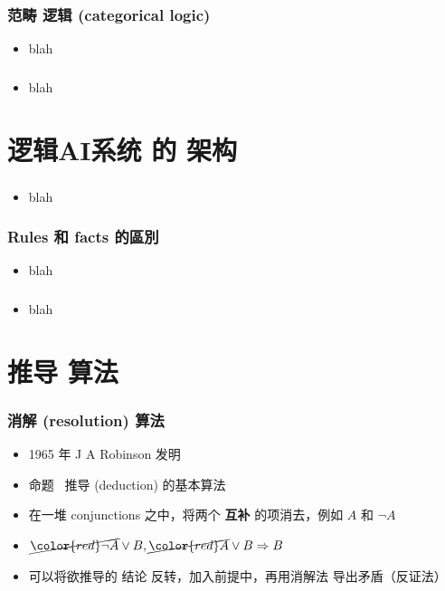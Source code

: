 \documentclass[17pt]{beamer}
\begin{document}
\begin{frame}
\frametitle{范畴 逻辑 (categorical logic)}
\begin{itemize}
	\item blah
\end{itemize}
\end{frame}

\begin{frame}
\frametitle{}
\begin{itemize}
	\item blah
\end{itemize}
\end{frame}

\section[Section]{逻辑AI系统 的 架构}
\frame{\sectionpage}

\begin{frame}
\frametitle{}
\begin{itemize}
	\item blah
\end{itemize}
\end{frame}


\begin{frame}
\frametitle{Rules 和 facts 的區別}
\begin{itemize}
	\item blah
\end{itemize}
\end{frame}



\begin{frame}
\frametitle{}
\begin{itemize}
	\item blah
\end{itemize}
\end{frame}

\section[Section]{推导 算法}
\frame{\sectionpage}

\begin{frame}
\frametitle{消解 (resolution) 算法}
\begin{itemize}
	\item 1965 年 J A Robinson 发明
	\item 命题 {\color{red}\ 推导} (deduction) 的基本算法
	\item 在一堆 conjunctions 之中，将两个 \textbf{互补} 的项消去，例如 $A$ 和 $\neg A$
	\item $\cancel{\color{red}\neg A} \vee B, \cancel{\color{red}A} \vee B \Rightarrow B$
	\item 可以将欲推导的 结论 反转，加入前提中，再用消解法 导出矛盾（反证法）
\end{itemize}
\end{frame}
\end{document}
